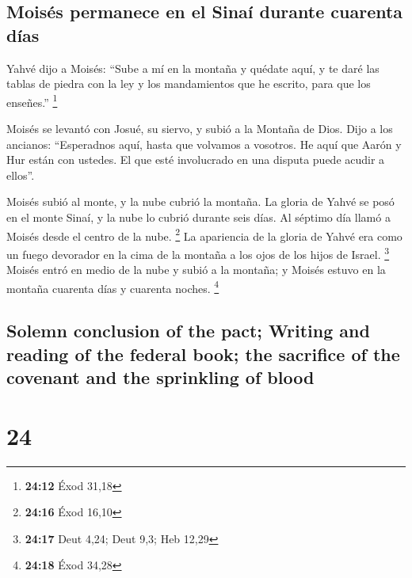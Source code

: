 \begin{paracol}{2}
\hypertarget{moisuxe9s-permanece-en-el-sinauxed-durante-cuarenta-duxedas}{%
\subsection{Moisés permanece en el Sinaí durante cuarenta
días}\label{moisuxe9s-permanece-en-el-sinauxed-durante-cuarenta-duxedas}}

 Yahvé dijo a Moisés: ``Sube a mí en la montaña y quédate
aquí, y te daré las tablas de piedra con la ley y los mandamientos que
he escrito, para que los enseñes.'' \footnote{\textbf{24:12} Éxod 31,18}

 Moisés se levantó con Josué, su siervo, y subió a la
Montaña de Dios.  Dijo a los ancianos: ``Esperadnos aquí,
hasta que volvamos a vosotros. He aquí que Aarón y Hur están con
ustedes. El que esté involucrado en una disputa puede acudir a ellos''.

 Moisés subió al monte, y la nube cubrió la montaña.
 La gloria de Yahvé se posó en el monte Sinaí, y la nube
lo cubrió durante seis días. Al séptimo día llamó a Moisés desde el
centro de la nube. \footnote{\textbf{24:16} Éxod 16,10} 
La apariencia de la gloria de Yahvé era como un fuego devorador en la
cima de la montaña a los ojos de los hijos de Israel. \footnote{\textbf{24:17}
  Deut 4,24; Deut 9,3; Heb 12,29}  Moisés entró en medio
de la nube y subió a la montaña; y Moisés estuvo en la montaña cuarenta
días y cuarenta noches. \footnote{\textbf{24:18} Éxod 34,28}

\switchcolumn
\begin{otherlanguage}{english}

\hypertarget{solemn-conclusion-of-the-pact-writing-and-reading-of-the-federal-book-the-sacrifice-of-the-covenant-and-the-sprinkling-of-blood}{%
\subsection{Solemn conclusion of the pact; Writing and reading of the
federal book; the sacrifice of the covenant and the sprinkling of
blood}\label{solemn-conclusion-of-the-pact-writing-and-reading-of-the-federal-book-the-sacrifice-of-the-covenant-and-the-sprinkling-of-blood}}

\hypertarget{section-47}{%
\section{24}\label{section-47}}


\end{otherlanguage}
\end{paracol}
